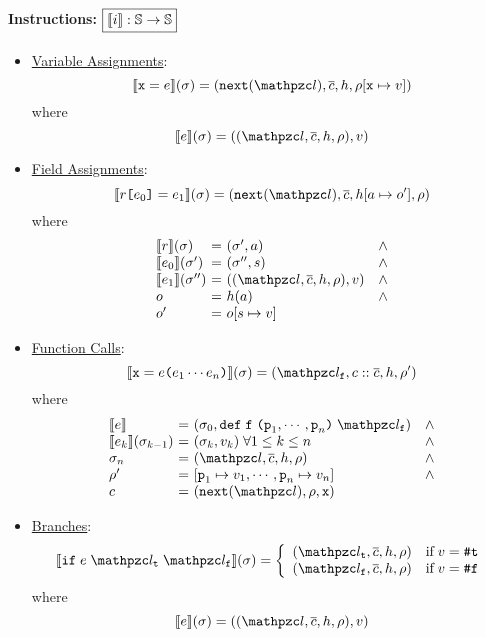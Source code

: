 \paragraph{Instructions: $\framebox{$\sem{\inst}: \stset \rightarrow \stset$}$}
\begin{itemize}
  \item \underline{Variable Assignments}:
    \[
      \sem{\varx = \expr}(\st) =
      (\getnext(\lab), \ctxts, \heap, \env[\varx \mapsto \val])
    \]
    where
    \[
      \sem{\expr}(\st) = ((\lab, \ctxts, \heap, \env), \val)
    \]

  \item \underline{Field Assignments}:
    \[
      \sem{\refer \kwsl \expr_0 \kwsr = \expr_1}(\st) =
      (\getnext(\lab), \ctxts, \heap[\addr \mapsto \obj'], \env)
    \]
    where
    \[
      \begin{array}{l@{~}c@{~}ll}
        \sem{\refer}(\st) &=& (\st', \addr) &\wedge\\
        \sem{\expr_0}(\st') &=& (\st'', \str) &\wedge\\
        \sem{\expr_1}(\st'') &=& ((\lab, \ctxts, \heap, \env), \val) &\wedge\\
        \obj &=& \heap(\addr) &\wedge\\
        \obj' &=& \obj[\str \mapsto \val]\\
      \end{array}
    \]

  \item \underline{Function Calls}:
    \[
      \sem{\varx = \expr \kwrl \expr_1 \cdots \expr_n \kwrr}(\st) =
      (\lab_\varf, \ctxt :: \ctxts, \heap, \env')
    \]
    where
    \[
      \begin{array}{l@{~}c@{~}ll}
        \sem{\expr} &=& (\st_0, \kwdef \; \varf \; \kwrl \varp_1, \cdots,
        \varp_n \kwrr \; \lab_\varf) &\wedge\\
        \sem{\expr_k}(\st_{k-1}) &=& (\st_k, \val_k) \; \forall 1 \leq k \leq n
        &\wedge\\
        \st_n &=& (\lab, \ctxts, \heap, \env) &\wedge\\
        \env' &=& [\varp_1 \mapsto \val_1, \cdots, \varp_n \mapsto \val_n]
        &\wedge\\
        \ctxt &=& (\getnext(\lab), \env, \varx)\\
      \end{array}
    \]

  \item \underline{Branches}:
    \[
      \sem{\kwif \; \expr \; \lab_\vart \; \lab_\varf}(\st) =
      \left\{
        \begin{array}{ll}
          (\lab_\vart, \ctxts, \heap, \env) & \text{if} \; \val = \true\\
          (\lab_\varf, \ctxts, \heap, \env) & \text{if} \; \val = \false\\
        \end{array}
      \right.
    \]
    where
    \[
      \sem{\expr}(\st) = ((\lab, \ctxts, \heap, \env), \val)
    \]


\end{itemize}
